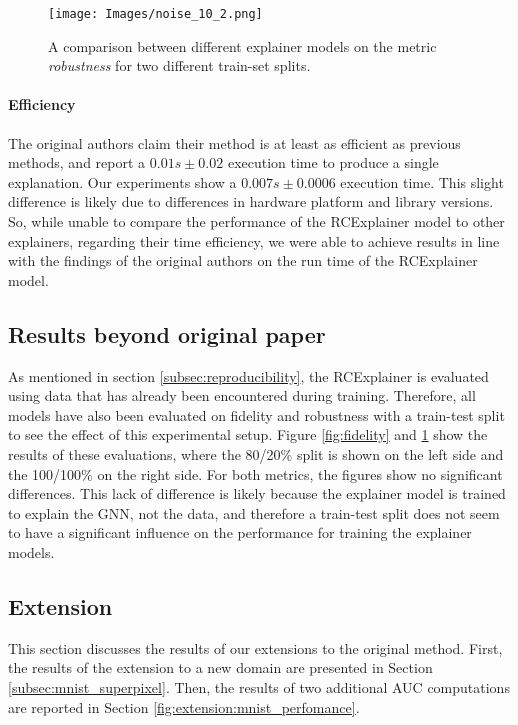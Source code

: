 \begin{figure}[h]
    \centerline{\texttt{[image: Images/noise\_10\_2.png]}}
    \caption{A comparison between different explainer models on the metric \textit{robustness} for two different train-set splits.}
    \label{fig:noise}
\end{figure}
\paragraph{Efficiency}
The original authors claim their method is at least as efficient as previous methods, and report a $0.01s\pm 0.02$ execution time to produce a single explanation. Our experiments show a $0.007s\pm 0.0006$ execution time. This slight difference is likely due to differences in hardware platform and library versions. So, while unable to compare the performance of the RCExplainer model to other explainers, regarding their time efficiency, we were able to achieve results in line with the findings of the original authors on the run time of the RCExplainer model.


\subsection{Results beyond original paper} \label{subsec:res_beyond_paper}
As mentioned in section \ref{subsec:reproducibility}, the RCExplainer is evaluated using data that has already been encountered during training. Therefore, all models have also been evaluated on fidelity and robustness with a train-test split to see the effect of this experimental setup. Figure \ref{fig:fidelity} and \ref{fig:noise} show the results of these evaluations, where the 80/20\% split is shown on the left side and the 100/100\% on the right side. For both metrics, the figures show no significant differences. This lack of difference is likely because the explainer model is trained to explain the GNN, not the data, and therefore a train-test split does not seem to have a significant influence on the performance for training the explainer models.

\subsection{Extension}
\label{sec:extension}
This section discusses the results of our extensions to the original method. First, the results of the extension to a new domain are presented in Section \ref{subsec:mnist_superpixel}. Then, the results of two additional AUC computations are reported in Section \ref{fig:extension:mnist_perfomance}. 

